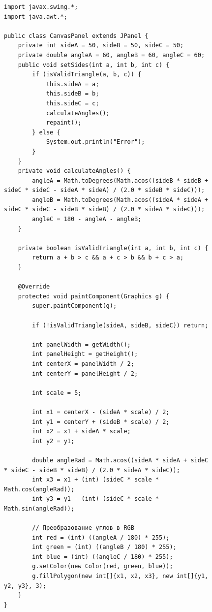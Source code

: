 \documentclass[a4paper, 14pt]{extarticle}
\begin{document}
\begin{figure}[!htb]
\begin{lstlisting}[language={},caption={Canvas variant 2},label={lst:code3}]
import javax.swing.*;
import java.awt.*;

public class CanvasPanel extends JPanel {
    private int sideA = 50, sideB = 50, sideC = 50;
    private double angleA = 60, angleB = 60, angleC = 60;
    public void setSides(int a, int b, int c) {
        if (isValidTriangle(a, b, c)) {
            this.sideA = a;
            this.sideB = b;
            this.sideC = c;
            calculateAngles();
            repaint();
        } else {
            System.out.println("Error");
        }
    }
    private void calculateAngles() {
        angleA = Math.toDegrees(Math.acos((sideB * sideB + sideC * sideC - sideA * sideA) / (2.0 * sideB * sideC)));
        angleB = Math.toDegrees(Math.acos((sideA * sideA + sideC * sideC - sideB * sideB) / (2.0 * sideA * sideC)));
        angleC = 180 - angleA - angleB;
    }

    private boolean isValidTriangle(int a, int b, int c) {
        return a + b > c && a + c > b && b + c > a;
    }

    @Override
    protected void paintComponent(Graphics g) {
        super.paintComponent(g);

        if (!isValidTriangle(sideA, sideB, sideC)) return;

        int panelWidth = getWidth();
        int panelHeight = getHeight();
        int centerX = panelWidth / 2;
        int centerY = panelHeight / 2;

        int scale = 5;

        int x1 = centerX - (sideA * scale) / 2;
        int y1 = centerY + (sideB * scale) / 2;
        int x2 = x1 + sideA * scale;
        int y2 = y1;

        double angleRad = Math.acos((sideA * sideA + sideC * sideC - sideB * sideB) / (2.0 * sideA * sideC));
        int x3 = x1 + (int) (sideC * scale * Math.cos(angleRad));
        int y3 = y1 - (int) (sideC * scale * Math.sin(angleRad));

        // Преобразование углов в RGB
        int red = (int) ((angleA / 180) * 255);
        int green = (int) ((angleB / 180) * 255);
        int blue = (int) ((angleC / 180) * 255);
        g.setColor(new Color(red, green, blue));
        g.fillPolygon(new int[]{x1, x2, x3}, new int[]{y1, y2, y3}, 3);
    }
}


\end{lstlisting}
\end{figure}
\end{document}
